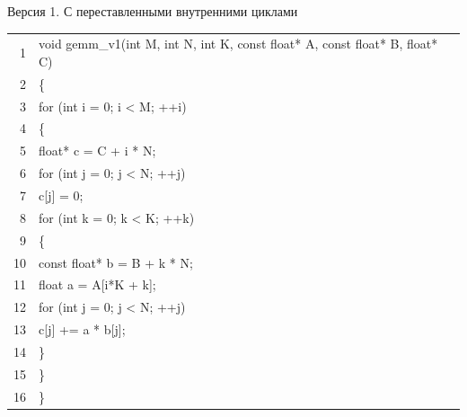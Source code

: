 \documentclass[aspectratio=169, 11pt]{beamer}
\newcommand{\K}[1]{\textcolor{kw}{#1}}   %
\newcommand{\T}[1]{\textcolor{tp}{#1}}   %
\newcommand{\N}[1]{\textcolor{nm}{#1}}   %
\newcommand{\V}[1]{\textcolor{vr}{#1}}   %
\begin{document}
\begin{frame}[fragile]{Версия 1. С переставленными внутренними циклами}
	\ttfamily\small
	\setlength{\baselineskip}{1.1em}
	\setlength{\parindent}{0pt}
	
	\begingroup
	\setlength{\fboxsep}{7pt}%
	\colorbox{codebg}{%
		\begin{minipage}{\dimexpr\linewidth-2\fboxsep\relax}
			\begin{tabular}{@{}r@{\hspace{1.2em}}l@{}}
				\textcolor{ln}{1} & \K{void} \V{gemm\_v1}(\T{int} \V{M}, \T{int} \V{N}, \T{int} \V{K}, \T{const} \T{float*} \V{A}, \T{const} \T{float*} \V{B}, \T{float*} \V{C}) \\
				\textcolor{ln}{2} & \{ \\
				\textcolor{ln}{3} & \hspace{2em}\K{for} (\T{int} \V{i} = \N{0}; \V{i} < \V{M}; ++\V{i}) \\
				\textcolor{ln}{4} & \hspace{2em}\{ \\
				\textcolor{ln}{5} & \hspace{4em}\T{float*} \V{c} = \V{C} + \V{i} * \V{N}; \\
				\textcolor{ln}{6} & \hspace{4em}\K{for} (\T{int} \V{j} = \N{0}; \V{j} < \V{N}; ++\V{j}) \\
				\textcolor{ln}{7} & \hspace{6em}\V{c}[\V{j}] = \N{0}; \\
				\textcolor{ln}{8} & \hspace{4em}\K{for} (\T{int} \V{k} = \N{0}; \V{k} < \V{K}; ++\V{k}) \\
				\textcolor{ln}{9} & \hspace{4em}\{ \\
				\textcolor{ln}{10} & \hspace{6em}\T{const} \T{float*} \V{b} = \V{B} + \V{k} * \V{N}; \\
				\textcolor{ln}{11} & \hspace{6em}\T{float} \V{a} = \V{A}[\V{i}*\V{K} + \V{k}]; \\
				\textcolor{ln}{12} & \hspace{6em}\K{for} (\T{int} \V{j} = \N{0}; \V{j} < \V{N}; ++\V{j}) \\
				\textcolor{ln}{13} & \hspace{8em}\V{c}[\V{j}] += \V{a} * \V{b}[\V{j}]; \\
				\textcolor{ln}{14} & \hspace{4em}\} \\
				\textcolor{ln}{15} & \hspace{2em}\} \\
				\textcolor{ln}{16} & \} \\
			\end{tabular}
		\end{minipage}%
	}%
	\endgroup
\end{frame}
\end{document}
